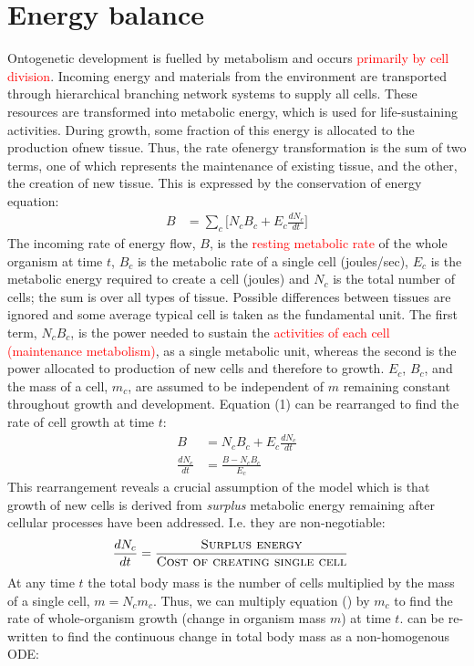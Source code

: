 \documentclass[a4paper]{article} %
\begin{document}
\section{Energy balance}
Ontogenetic development is fuelled by metabolism and occurs \textcolor{red}{primarily by cell division}. Incoming energy and materials from the environment are transported through hierarchical branching network systems to supply all cells. These resources are transformed into metabolic energy, which is used for life-sustaining activities. During growth, some fraction of this energy is allocated to the production ofnew tissue. Thus, the rate ofenergy transformation is the sum of two terms, one of which represents the maintenance of existing tissue, and the other, the creation of new tissue. This is expressed by the conservation of energy equation:
\begin{align}
    B &= \sum_c \Bigg[N_{c}B_{c} + E_{c}\frac{dN_{c}}{dt}\Bigg]
\end{align}
The incoming rate of energy flow, $B$, is the \textcolor{red}{resting metabolic rate} of the whole organism at time $t$, $B_c$ is the metabolic rate of a single cell (joules/sec), $E_c$ is the metabolic energy required to create a cell (joules) and $N_c$ is the total number of cells; the sum is over all types of tissue. Possible differences between tissues are ignored and some average typical cell is taken as the fundamental unit. The first term, $N_{c}B_{c}$, is the power needed to sustain the \textcolor{red}{activities of each cell (maintenance metabolism)}, as a single metabolic unit, whereas the second is the power allocated to production of new cells and therefore to growth. $E_c$, $B_c$, and the mass of a cell, $m_c$, are assumed to be independent of $m$ remaining constant throughout growth and development. Equation (1) can be rearranged to find the rate of cell growth at time $t$: 
\begin{align}
    B &= N_{c}B_{c} + E_{c}\frac{dN_{c}}{dt} \\
    \frac{dN_{c}}{dt} &= \frac{B - N_{c}B_{c}}{E_{c}}
\end{align}
This rearrangement reveals a crucial assumption of the model which is that growth of new cells is derived from \textit{surplus} metabolic energy remaining after cellular processes have been addressed. I.e. they are non-negotiable:
\begin{align}    
    \frac{dN_{c}}{dt} &= \frac{\textsc{Surplus energy}}{\textsc{Cost of creating single cell}}
\end{align}
At any time $t$ the total body mass is the number of cells multiplied by the mass of a single cell, $m = N_{c}m_{c}$. Thus, we can multiply equation () by $m_{c}$ to find the rate of whole-organism growth (change in organism mass $m$) at time $t$. can be re-written to find the continuous change in total body mass as a non-homogenous ODE:
\end{document}
